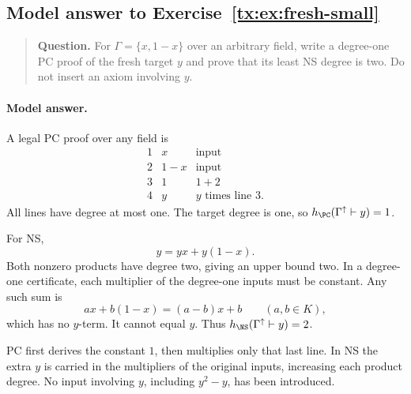 \par


\begin{samepage}

\subsection*{Model answer to Exercise~\ref{tx:ex:fresh-small}}\label{tx:ans:fresh-small}

\begin{quote}\small\textbf{Question.} For $\Gamma=\{x,1-x\}$ over an arbitrary field, write a degree-one PC
proof of the fresh target $y$ and prove that its least NS degree is two.
Do not insert an axiom involving $y$.
\end{quote}

\paragraph{Model answer.}
A legal PC proof over any field is
\[
 \begin{array}{c|l|l}
 1&x&\text{input}\\
 2&1-x&\text{input}\\
 3&1&1+2\\
 4&y&y\text{ times line }3.
 \end{array}
\]
All lines have degree at most one. The target degree is one, so
\(h_{\PC}(\Gamma^\uparrow\vdash y)=1\).
\end{samepage}

For NS,
\[
                            y=yx+y(1-x).
\]
Both nonzero products have degree two, giving an upper bound two.
In a degree-one certificate, each multiplier of the degree-one
inputs must be constant. Any such sum is
\[
                       ax+b(1-x)=(a-b)x+b
                       \qquad(a,b\in K),
\]
which has no \(y\)-term. It cannot equal \(y\).
Thus \(h_{\NS}(\Gamma^\uparrow\vdash y)=2\).

PC first derives the constant \(1\), then multiplies only that last
line. In NS the extra \(y\) is carried in the multipliers of the
original inputs, increasing each product degree. No input involving
\(y\), including \(y^2-y\), has been introduced.


\par


